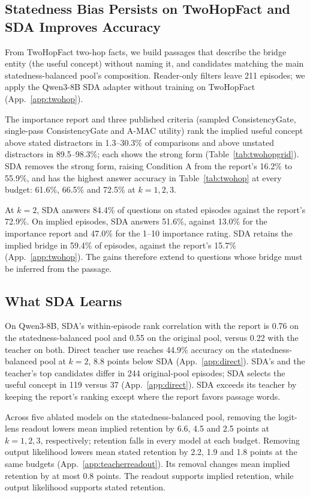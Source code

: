 \subsection{Statedness Bias Persists on TwoHopFact and SDA Improves Accuracy}\label{sec:twohop}

From TwoHopFact \citep{yang2024latent} two-hop facts, we build passages that describe the bridge entity (the useful concept) without naming it, and candidates matching the main statedness-balanced pool's composition. Reader-only filters leave 211 episodes; we apply the Qwen3-8B SDA adapter without training on TwoHopFact (App.~\ref{app:twohop}).

The importance report and three published criteria (sampled ConsistencyGate, single-pass ConsistencyGate and A-MAC utility) rank the implied useful concept above stated distractors in 1.3--30.3\% of comparisons and above unstated distractors in 89.5--98.3\%; each shows the strong form (Table~\ref{tab:twohopgrid}). SDA removes the strong form, raising Condition A from the report's 16.2\% to 55.9\%, and has the highest answer accuracy in Table~\ref{tab:twohop} at every budget: 61.6\%, 66.5\% and 72.5\% at $k=1,2,3$.

At $k=2$, SDA answers 84.4\% of questions on stated episodes against the report's 72.9\%. On implied episodes, SDA answers 51.6\%, against 13.0\% for the importance report and 47.0\% for the 1--10 importance rating. SDA retains the implied bridge in 59.4\% of episodes, against the report's 15.7\% (App.~\ref{app:twohop}). The gains therefore extend to questions whose bridge must be inferred from the passage.

\subsection{What SDA Learns}\label{sec:learns}\label{sec:ablations}

On Qwen3-8B, SDA's within-episode rank correlation with the report is 0.76 on the statedness-balanced pool and 0.55 on the original pool, versus 0.22 with the teacher on both. Direct teacher use reaches 44.9\% accuracy on the statedness-balanced pool at $k=2$, 8.8 points below SDA (App.~\ref{app:direct}). SDA's and the teacher's top candidates differ in 244 original-pool episodes; SDA selects the useful concept in 119 versus 37 (App.~\ref{app:direct}). SDA exceeds its teacher by keeping the report's ranking except where the report favors passage words.

Across five ablated models on the statedness-balanced pool, removing the logit-lens readout lowers mean implied retention by 6.6, 4.5 and 2.5 points at $k=1,2,3$, respectively; retention falls in every model at each budget. Removing output likelihood lowers mean stated retention by 2.2, 1.9 and 1.8 points at the same budgets (App.~\ref{app:teacherreadout}). Its removal changes mean implied retention by at most 0.8 points. The readout supports implied retention, while output likelihood supports stated retention.

